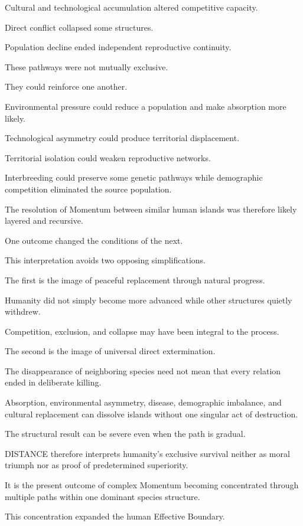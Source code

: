 Cultural and technological accumulation altered competitive capacity.

Direct conflict collapsed some structures.

Population decline ended independent reproductive continuity.

These pathways were not mutually exclusive.

They could reinforce one another.

Environmental pressure could reduce a population and make absorption more likely.

Technological asymmetry could produce territorial displacement.

Territorial isolation could weaken reproductive networks.

Interbreeding could preserve some genetic pathways while demographic competition eliminated the source population.

The resolution of Momentum between similar human islands was therefore likely layered and recursive.

One outcome changed the conditions of the next.

This interpretation avoids two opposing simplifications.

The first is the image of peaceful replacement through natural progress.

Humanity did not simply become more advanced while other structures quietly withdrew.

Competition, exclusion, and collapse may have been integral to the process.

The second is the image of universal direct extermination.

The disappearance of neighboring species need not mean that every relation ended in deliberate killing.

Absorption, environmental asymmetry, disease, demographic imbalance, and cultural replacement can dissolve islands without one singular act of destruction.

The structural result can be severe even when the path is gradual.

DISTANCE therefore interprets humanity’s exclusive survival neither as moral triumph nor as proof of predetermined superiority.

It is the present outcome of complex Momentum becoming concentrated through multiple paths within one dominant species structure.

This concentration expanded the human Effective Boundary.

